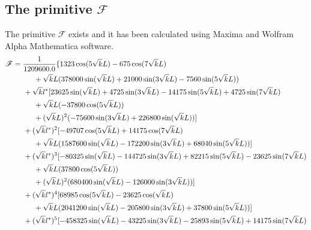 \subsection{The primitive \texorpdfstring{$\mathscr{F}$}{F}}
The primitive $\mathscr{F}$ exists and it has been calculated using Maxima \cite{Maxima} and Wolfram Alpha Mathematica\cite{Wolfram} software.
 \begin{align*}
  \mathscr{F}&=\frac{1}{1209600.0} \{1323 \cos(5\sqrt{k}L)-675 \cos(7\sqrt{k}L)\\
        &\hspace{1cm}+\sqrt{k}L (378000 \sin(\sqrt{k}L)+21000 \sin(3\sqrt{k}L)-7560 \sin(5\sqrt{k}L))\\
        &\hspace{0.5cm}+\sqrt{k}l^* [23625 \sin(\sqrt{k}L)+4725 \sin(3\sqrt{k}L)-14175 \sin(5\sqrt{k}L)+4725 \sin(7\sqrt{k}L)\\
        &\hspace{1cm}+\sqrt{k}L  (-37800 \cos(5\sqrt{k}L))\\
        &\hspace{1cm}+(\sqrt{k}L)^2 (-75600 \sin(3\sqrt{k}L)+226800 \sin(\sqrt{k}L))]\\
        &\hspace{0.5cm}+(\sqrt{k}l^*)^2 [-49707 \cos(5\sqrt{k}L)+14175 \cos(7\sqrt{k}L)\\
        &\hspace{1cm}+\sqrt{k}L  (1587600 \sin(\sqrt{k}L)-172200 \sin(3\sqrt{k}L)+68040 \sin(5\sqrt{k}L))]\\
        &\hspace{0.5cm}+(\sqrt{k}l^*)^3 [-80325 \sin(\sqrt{k}L)-144725 \sin(3\sqrt{k}L)+82215 \sin(5\sqrt{k}L)-23625 \sin(7\sqrt{k}L)\\
        &\hspace{1cm}+\sqrt{k}L  (37800 \cos(5\sqrt{k}L))\\
        &\hspace{1cm}+(\sqrt{k}L)^2 (680400 \sin(\sqrt{k}L)-126000 \sin(3\sqrt{k}L))]\\
        &\hspace{0.5cm}+(\sqrt{k}l^*)^4 [68985 \cos(5\sqrt{k}L)-23625 \cos(\sqrt{k}L)\\
        &\hspace{1cm}+\sqrt{k}L  (2041200 \sin(\sqrt{k}L)-205800 \sin(3\sqrt{k}L)+37800 \sin(5\sqrt{k}L))]\\
        &\hspace{0.5cm}+(\sqrt{k}l^*)^5 [-458325 \sin(\sqrt{k}L)-43225 \sin(3\sqrt{k}L)-25893 \sin(5\sqrt{k}L)+14175 \sin(7\sqrt{k}L)\\

\end{align*}
